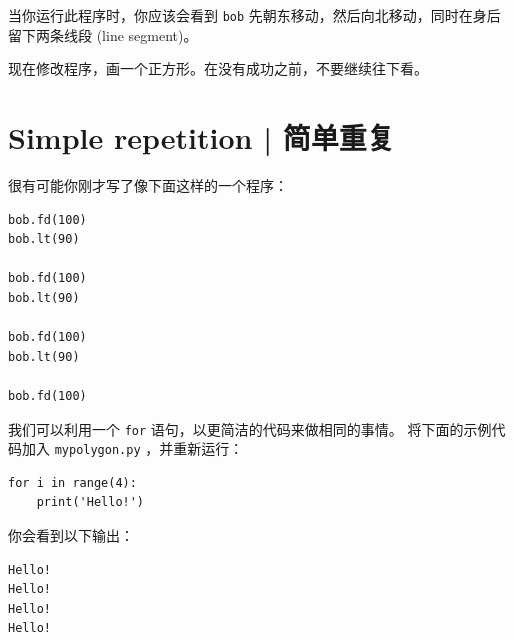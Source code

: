 当你运行此程序时，你应该会看到 \lstinline{bob} 先朝东移动，然后向北移动，同时在身后留下两条线段 (line segment)。


现在修改程序，画一个正方形。在没有成功之前，不要继续往下看。



\section{Simple repetition  |  简单重复}
\label{repetition}
  


很有可能你刚才写了像下面这样的一个程序：

\begin{lstlisting}
bob.fd(100)
bob.lt(90)

bob.fd(100)
bob.lt(90)

bob.fd(100)
bob.lt(90)

bob.fd(100)
\end{lstlisting}


我们可以利用一个 \lstinline{for} 语句，以更简洁的代码来做相同的事情。
将下面的示例代码加入 \lstinline{mypolygon.py} ，并重新运行：
    

\begin{lstlisting}
for i in range(4):
    print('Hello!')
\end{lstlisting}


你会看到以下输出：

\begin{lstlisting}
Hello!
Hello!
Hello!
Hello!
\end{lstlisting}


